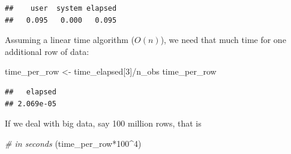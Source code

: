 \documentclass[
  12pt,
]{style/krantz}
\newenvironment{Shaded}{\begin{snugshade}}{\end{snugshade}}
\newcommand{\CommentTok}[1]{\textcolor[rgb]{0.56,0.35,0.01}{\textit{#1}}}
\newcommand{\ControlFlowTok}[1]{\textcolor[rgb]{0.13,0.29,0.53}{\textbf{#1}}}
\newcommand{\DecValTok}[1]{\textcolor[rgb]{0.00,0.00,0.81}{#1}}
\newcommand{\FloatTok}[1]{\textcolor[rgb]{0.00,0.00,0.81}{#1}}
\newcommand{\FunctionTok}[1]{\textcolor[rgb]{0.00,0.00,0.00}{#1}}
\newcommand{\NormalTok}[1]{#1}
\newcommand{\OtherTok}[1]{\textcolor[rgb]{0.56,0.35,0.01}{#1}}
\newcommand{\SpecialCharTok}[1]{\textcolor[rgb]{0.00,0.00,0.00}{#1}}
\begin{document}
\begin{Shaded}
\end{Shaded}

\begin{verbatim}
##    user  system elapsed 
##   0.095   0.000   0.095
\end{verbatim}

Assuming a linear time algorithm (\(O(n)\)), we need that much time for one additional row of data:

\begin{Shaded}
\begin{Highlighting}[]
\NormalTok{time\_per\_row }\OtherTok{\textless{}{-}}\NormalTok{ time\_elapsed[}\DecValTok{3}\NormalTok{]}\SpecialCharTok{/}\NormalTok{n\_obs}
\NormalTok{time\_per\_row}
\end{Highlighting}
\end{Shaded}

\begin{verbatim}
##   elapsed 
## 2.069e-05
\end{verbatim}

If we deal with big data, say 100 million rows, that is

\begin{Shaded}
\begin{Highlighting}[]
\CommentTok{\# in seconds}
\NormalTok{(time\_per\_row}\SpecialCharTok{*}\DecValTok{100}\SpecialCharTok{\^{}}\DecValTok{4}\NormalTok{) }
\end{Highlighting}
\end{Shaded}
\end{document}
